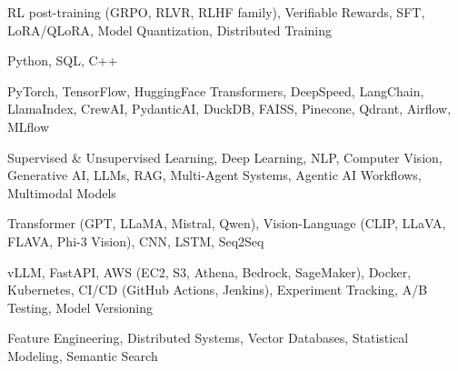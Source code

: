 \documentclass[letter,10pt]{article}
\begin{document}
 RL post-training (GRPO, RLVR, RLHF family), Verifiable Rewards, SFT, LoRA/QLoRA, Model Quantization, Distributed Training\par\vspace{2pt}

 Python, SQL, C++\par\vspace{2pt}

 PyTorch, TensorFlow, HuggingFace Transformers, DeepSpeed, LangChain, LlamaIndex, CrewAI, PydanticAI, DuckDB, FAISS, Pinecone, Qdrant, Airflow, MLflow\par\vspace{2pt}

 Supervised \& Unsupervised Learning, Deep Learning, NLP, Computer Vision, Generative AI, LLMs, RAG, Multi-Agent Systems, Agentic AI Workflows, Multimodal Models\par\vspace{2pt}

 Transformer (GPT, LLaMA, Mistral, Qwen), Vision-Language (CLIP, LLaVA, FLAVA, Phi-3 Vision), CNN, LSTM, Seq2Seq\par\vspace{2pt}

 vLLM, FastAPI, AWS (EC2, S3, Athena, Bedrock, SageMaker), Docker, Kubernetes, CI/CD (GitHub Actions, Jenkins), Experiment Tracking, A/B Testing, Model Versioning\par\vspace{2pt}

 Feature Engineering, Distributed Systems, Vector Databases, Statistical Modeling, Semantic Search
\end{document}
